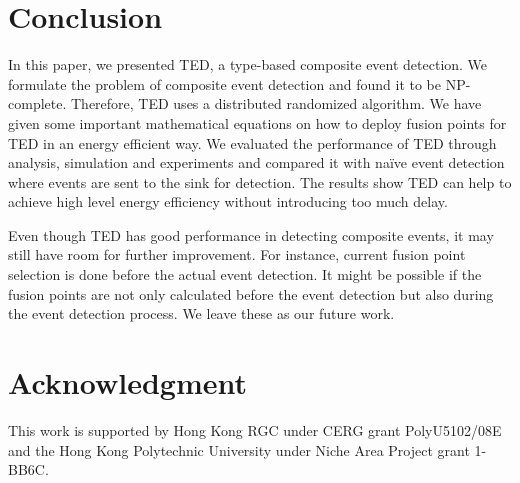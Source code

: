 \section{Conclusion}
\label{sec:conclusion}
In this paper, we presented TED, a type-based composite event detection. We formulate the problem of composite event detection and found it to be NP-complete. Therefore, TED uses a distributed randomized algorithm. We have given some important mathematical equations on how to deploy fusion points for TED in an energy efficient way. We evaluated the performance of TED through analysis, simulation and experiments and compared it with na\"{i}ve event detection where events are sent to the sink for detection. The results show TED can help to achieve high level energy efficiency without introducing too much delay.

Even though TED has good performance in detecting composite events, it may still have room for further improvement. For instance, current fusion point selection is done before the actual event detection. It might be possible if the fusion points are not only calculated before the event detection but also during the event detection process. We leave these as our future work.

\section*{Acknowledgment}
This work is supported by Hong Kong RGC under CERG grant PolyU5102/08E and the Hong Kong Polytechnic University under Niche Area Project grant 1-BB6C.